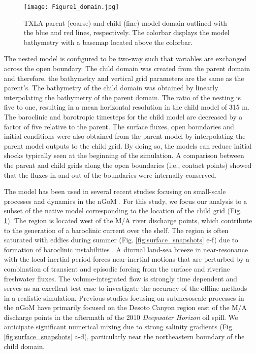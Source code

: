 \documentclass[draft]{agujournal2019}
\begin{document}
\begin{figure}[ht] 
 \centerline{\texttt{[image: Figure1\_domain.jpg]}}
  \caption{TXLA parent (coarse) and child (fine) model domain outlined with the blue and red lines, respectively. The colorbar displays the model bathymetry with a basemap located above the colorbar.}
  \label{fig:domain_overview}
\end{figure}

The nested model is configured to be two-way such that variables are exchanged across the open boundary. The child domain was created from the parent domain and therefore, the bathymetry and vertical grid parameters are the same as the parent’s. The bathymetry of the child domain was obtained by linearly interpolating the bathymetry of the parent domain. The ratio of the nesting is five to one, resulting in a mean horizontal resolution in the child model of 315 m. The baroclinic and barotropic timesteps for the child model are decreased by a factor of five relative to the parent. The surface fluxes, open boundaries and initial conditions were also obtained from the parent model by interpolating the parent model outputs to the child grid.  By doing so, the models can reduce initial shocks typically seen at the beginning of the simulation. A comparison between the parent and child grids along the open boundaries (i.e., contact points) showed that the fluxes in and out of the boundaries were internally conserved. 

The model has been used in several recent studies focusing on small-scale processes and dynamics in the nGoM \cite{Kobashi_2020,qu2021near, Qu_2022_NIW, Xomchuk_2020}. For this study, we focus our analysis to a subset of the native model corresponding to the location of the child grid (Fig. \ref{fig:domain_overview}). The region is located west of the M/A river discharge points, which contribute to the generation of a baroclinic current over the shelf. The region is often saturated with eddies during summer (Fig. \ref{fig:surface_snapshots} e-f) due to formation of baroclinic instabilities \cite{Hetland_2017,Zhang_2012_numerical}. A diurnal land-sea breeze in near-resonance with the local inertial period forces near-inertial motions that are perturbed by a combination of transient and episodic forcing from the surface and riverine freshwater fluxes. The volume-integrated flow is strongly time dependent and serves as an excellent test case to investigate the accuracy of the offline methods in a realistic simulation. Previous studies focusing on submesoscale processes in the nGoM \cite{Barkan_2017,Luo_2016} have primarily focused on the Desoto Canyon region east of the M/A discharge points in the aftermath of the 2010 \textit{Deepwater Horizon} oil spill. We anticipate significant numerical mixing due to strong salinity gradients (Fig. \ref{fig:surface_snapshots} a-d), particularly near the northeastern boundary of the child domain. 
\end{document}
